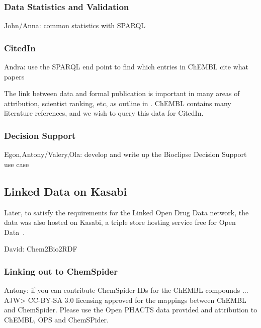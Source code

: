 \documentclass[sw]{iosart2c}
\begin{document}
\subsubsection{Data Statistics and Validation}

John/Anna: common statistics with SPARQL

\subsubsection{CitedIn}

Andra: use the SPARQL end point to find which entries in ChEMBL cite what papers
 
The link between data and formal publication is important in many areas of
attribution, scientist ranking, etc, as outline in \cite{Waagmeester2012}.
ChEMBL contains many literature references, and we wish to query this data
for CitedIn.

\subsubsection{Decision Support}

Egon,Antony/Valery,Ola: develop and write up the Bioclipse Decision Support use case

\subsection{Linked Data on Kasabi}

Later, to satisfy the requirements for the Linked Open Drug Data \cite{Samwald2011}
network, the data was also hosted on Kasabi, a triple store hosting service
free for Open Data~\cite{kasabi}.

David: Chem2Bio2RDF

\subsubsection{Linking out to ChemSpider}

Antony: if you can contribute ChemSpider IDs for the ChEMBL compounds ... 
AJW> CC-BY-SA 3.0 licensing approved for the mappings between ChEMBL and ChemSpider. Please use the Open PHACTS data provided and attribution to ChEMBL, OPS and ChemSPider.
\end{document}
